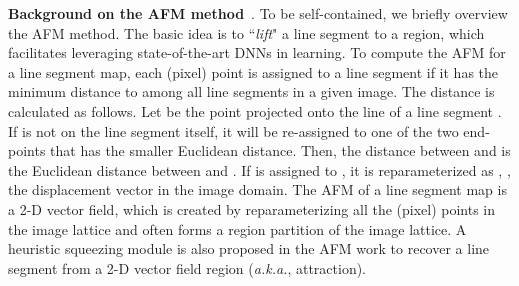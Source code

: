 \documentclass[10pt,twocolumn,letterpaper]{article}
\begin{document}
\textbf{Background on the AFM method}~\cite{afm}. To be self-contained, we briefly overview the AFM method. The basic idea is to ``\textit{lift}" a line segment to a region, which facilitates leveraging state-of-the-art DNNs in learning. To compute the AFM for a line segment map, each (pixel) point  is assigned to a line segment  if it has the minimum distance to  among all line segments in a given image. The distance is calculated as follows. Let  be the point projected onto the line  of a line segment . If  is not on the line segment  itself, it will be re-assigned to one of the two end-points that has the smaller Euclidean distance. Then, the distance between  and  is the Euclidean distance between  and . If  is assigned to , it is reparameterized as , \ie, the displacement vector in the image domain. The AFM of a line segment map is a 2-D vector field, which is created by reparameterizing all the (pixel) points in the image lattice  and often forms a region partition of the image lattice. A heuristic squeezing module is also proposed in the AFM work to recover a line segment from a 2-D vector field region (\emph{a.k.a.}, attraction). 
\end{document}

